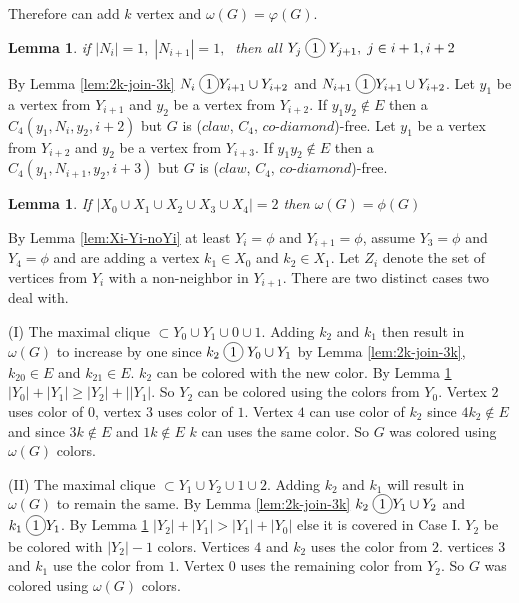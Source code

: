 \documentclass[12pt]{article}
\newcommand*\circled[1]{\tikz[baseline=(char.base)]{
            \node[shape=circle,draw,inner sep=2pt] (char) {#1};}}
\newtheorem{Lemma}[Theorem]{Lemma}
\def\CCD{($claw$, $C_4$, $co$-$diamond$)}
\begin{document}
{Therefore can add $k$ vertex and $\omega(G) = \varphi(G)$.

\begin{Lemma}\label{lem:2-xi-2yi-join}
if $|N_i| = 1,\; |N_{i+1}| = 1,\;$ then all $Y_j \;\circled{1}\; Y_{j+1},\; j \in {i+1, i+2}$
\end{Lemma}
 By Lemma \ref{lem:2k-join-3k} $N_i \;\circled{1} Y_{i+1} \cup Y_{i+2}$ and $N_{i+1} \;\circled{1} Y_{i+1} \cup Y_{i+2}$. Let $y_1$ be a vertex from $Y_{i+1}$ and $y_2$ be a vertex from $Y_{i+2}$. If $y_1y_2 \not \in E$ then a $C_4 (y_1,N_i,y_2, i+2)$ but $G$ is {\CCD}-free. Let $y_1$ be a vertex from $Y_{i+2}$ and $y_2$ be a vertex from $Y_{i+3}$. If $y_1y_2 \not \in E$ then a $C_4 (y_1,N_{i+1},y_2, i+3)$ but $G$ is {\CCD}-free.


\begin{Lemma}\label{lem:add-two-2vertex}
If $|X_0 \cup X_1 \cup X_2 \cup X_3 \cup X_4| = 2$ then $\omega(G) =  \phi(G)$
\end{Lemma}
By Lemma \ref{lem:Xi-Yi-noYi} at least $Y_i = \phi$ and $Y_{i+1} = \phi$, assume $Y_3 = \phi$ and $Y_4 = \phi$ and are adding a vertex $k_1 \in X_0$ and $k_2 \in X_1$. Let $Z_i$ denote the set of vertices from $Y_i$ with a non-neighbor in $Y_{i+1}$. There are two distinct cases two deal with.

(I) The maximal clique $\subset Y_0 \cup Y_1 \cup 0 \cup 1$. Adding $k_2$ and $k_1$ then result in $\omega(G)$ to increase by one since $k_2 \;\circled{1}\; Y_0 \cup Y_1$ by Lemma \ref{lem:2k-join-3k}, $k_20 \in E$ and $k_21 \in E$. $k_2$ can be colored with the new color. By Lemma \ref{lem:2-xi-2yi-join}  $|Y_0| + |Y_1| \geq |Y_2| +|  |Y_1|$. So $Y_2$ can be colored using the colors from $Y_0$. Vertex $2$ uses color of $0$, vertex $3$ uses color of $1$. Vertex $4$ can use color of $k_2$ since $4k_2 \not \in E$ and since $3k \not \in E$ and $1k \not \in E$ $k$ can uses the same color. So $G$ was colored using $\omega(G)$ colors.

(II) The maximal clique $\subset Y_1 \cup Y_2 \cup 1 \cup 2$. Adding $k_2$ and $k_1$ will result in $\omega(G)$ to remain the same. By Lemma \ref{lem:2k-join-3k} $k_2 \;\circled{1} Y_1 \cup Y_2$ and $k_1 \;\circled{1} Y_1$. By Lemma \ref{lem:2-xi-2yi-join} $|Y_2| + |Y_1| > |Y_1| + |Y_0|$ else it is covered in Case I. $Y_2$ be be colored with $|Y_2| - 1$ colors. Vertices $4$ and $k_2$ uses the color from $2$. vertices $3$ and $k_1$ use the color from $1$. Vertex $0$ uses the remaining color from $Y_2$. So $G$ was colored using $\omega(G)$ colors.



}
\end{document}
